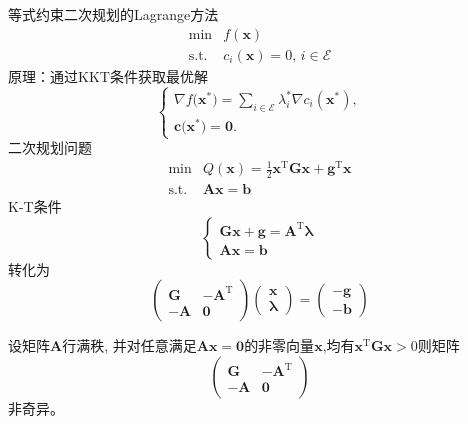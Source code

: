 \begin{note}
    等式约束二次规划的Lagrange方法
    \[
        \begin{array}{rl}
            \min & f(\boldsymbol{x})\\
            \operatorname{s.t.} & c_{i}(\boldsymbol{x}) = 0,\, i\in\mathcal{E}
        \end{array}
    \]
    原理：通过KKT条件获取最优解 
    \[
        \begin{cases}
            \nabla f\big(\boldsymbol{x}^*\big)=\sum\limits_{i\in\mathcal{E}}\lambda_i^*\nabla c_i(\boldsymbol{x}^*),\\
            \boldsymbol{c}\big(\boldsymbol{x}^*\big)=\boldsymbol{0}.
        \end{cases}
    \]
    二次规划问题
    \[
        \begin{array}{rl}
            \min&Q(\boldsymbol{x})=\frac12\boldsymbol{x}^\mathrm{T}\boldsymbol{G}\boldsymbol{x}+\boldsymbol{g}^\mathrm{T}\boldsymbol{x}\\
            \mathrm{s.t.}&\boldsymbol{A}\boldsymbol{x}=\boldsymbol{b}
        \end{array}
    \]
    K-T条件
    \[
        \left\{
            \begin{array}{l}
                {\boldsymbol{Gx}+\boldsymbol{g}=\boldsymbol{A}^{\mathrm{T}}\boldsymbol{\lambda}}\\
                {\boldsymbol{Ax}=\boldsymbol{b}}
            \end{array}
        \right.
    \]
    转化为
    \[
        \begin{pmatrix}
            \boldsymbol{G} & -\boldsymbol{A}^{\mathrm{T}}\\
            -\boldsymbol{A} & \boldsymbol{0}
        \end{pmatrix}
        \begin{pmatrix}
            \boldsymbol{x}\\ \boldsymbol{\lambda}
        \end{pmatrix}
        =
        \begin{pmatrix}
            -\boldsymbol{g}\\-\boldsymbol{b}
        \end{pmatrix}
    \]
\end{note}
\begin{theorem}
    设矩阵$\boldsymbol{A}$行满秩, 并对任意满足$\boldsymbol{Ax} = \boldsymbol{0}$的非零向量$\boldsymbol{x}$,均有$\boldsymbol{x}^{\mathrm{T}}\boldsymbol{Gx}>0$则矩阵
    \[
        \begin{pmatrix}
            \boldsymbol{G} & -\boldsymbol{A}^{\mathrm{T}}\\
            -\boldsymbol{A} & \boldsymbol{0}
        \end{pmatrix}
    \]
    非奇异。
\end{theorem}
